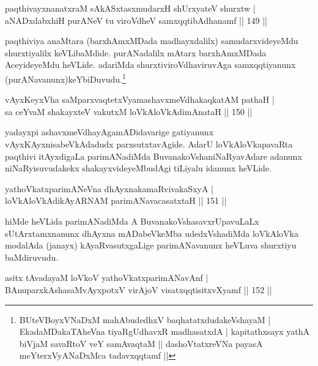 
\begin{shl}
paqthivayxnanatxraM sAkASxtasxmudarxH shUrxyateV shurxtw |\\
aNADxdabxhiH purANeV tu viroVdheV samxqqtibAdhanamf \hfill || 149 ||
\end{shl}

\begin{artha}
paqthiviya anaMtara (barxhAmxMDada madhayxdalilx) samudarxvideyeMdu shurxtiyalilx keVLibaMdide. purANadalilx mAtarx barxhAmxMDada AceyideyeMdu heVLide. adariMda shurxtiviroVdhaviruvAga samxqqtiyanunx (purANavanunx)keYbiDuvudu.\footnote{BUteVBoyxVNaDxM mahAbudedhxV baqhatatxdudakeVshayaM |
 EkadaMDakaTAheVna tiyaRgUdhavxR madhasatxdA |
 kapitathxsayx yathA biVjaM savaRtoV veY samAvaqtaM ||
 dashoVtatxreVNa payasA meYterxVyANaDxMca tadavxqqtamf ||}
\end{artha}

\begin{shl}
vAyxKeyxVha saMparxvaqtetxVyamashavxmeVdhakaqkatAM pathaH |\\
sa ceYvaM shakayxteV vakutxM loVkAloVkAdimAnataH \hfill || 150 ||
\end{shl}

\begin{artha}
yadayxpi ashavxmeVdhayAgamADidavarige gatiyanunx vAyxKAyxnisabeVkAdadudx parxsutxtavAgide. AdarU loVkAloVkapavaRta paqthivi itAyxdigaLa parimANadiMda BuvanakoVshaniNaRyavAdare adanunx niNaRyisuvudakekx shakayxvideyeMbudAgi tiLiyalu idanunx heVLide.
\end{artha}


\begin{shl}
yathoVkatxparimANeVna dhAyxnakamaRvivakaSxyA |\\
loVkAloVkAdikAyARNAM parimANavacasatxtaH \hfill || 151 ||
\end{shl}

\begin{artha}
hiMde heVLida parimANadiMda A BuvanakoVshasavxrUpavuLaLx sUtArxtamxnanunx dhAyxna mADabeVkeMba udedxVshadiMda loVkAloVka modalAda (janayx) kAyaRvasutxgaLige parimANavanunx heVLuva shurxtiyu baMdiruvudu.
\end{artha}


\begin{shl}
asitx tAvadayaM loVkoV yathoVkatxparimANavAnf |\\
BAnuparxkAshasaMvAyxpotxV virAjoV visatxqqtisitxvXyamf \hfill || 152 ||
\end{shl}

